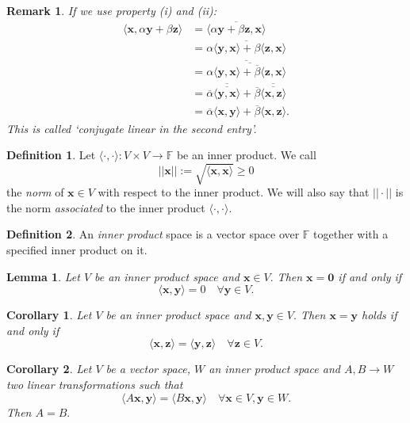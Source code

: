 \documentclass[12pt, a4paper]{article}
\newcommand{\bb}[1]{\mathbb{#1}}
\newtheorem*{remark}{Remark}
\theoremstyle{definition}
\newtheorem{definition}{Definition}[section]
\theoremstyle{plain}
\newtheorem{corollary}{Corollary}[theorem]
\newtheorem{lemma}[theorem]{Lemma}
\begin{document}
\begin{remark}
If we use property (i) and (ii): $$\begin{aligned}
\langle \mathbf{x},\alpha\mathbf{y}+\beta\mathbf{z} \rangle &=\overline{\langle \alpha\mathbf{y}+\beta\mathbf{z}, \mathbf{x} \rangle} \\
&=\overline{\alpha\langle \mathbf{y,x} \rangle +\beta \langle \mathbf{z,x} \rangle}\\
&=\overline{\alpha\overline{\langle \mathbf{y,x} \rangle+\overline{\beta}\langle \mathbf{z,x} \rangle}} \\
&=\overline{\alpha}\overline{\overline{\langle \mathbf{y,x} \rangle}}+\overline{\beta}\overline{\overline{\langle \mathbf{x,z} \rangle}}\\
&=\overline{\alpha}\langle \mathbf{x,y} \rangle+\overline{\beta}\langle \mathbf{x,z} \rangle.
\end{aligned}$$ This is called `conjugate linear in the second entry'.
\end{remark}

\begin{definition}
Let $\langle \cdot,\cdot \rangle:V\times V \to \bb{F}$ be an inner product. We call $$||\mathbf{x}||:=\sqrt{\langle \mathbf{x,x} \rangle}\geq 0$$ the \textit{norm} of $\mathbf{x}\in V$ with respect to the inner product. We will also say that $||\cdot||$ is the norm \textit{associated} to the inner product $\langle \cdot,\cdot \rangle.$
\end{definition}

\begin{definition}
An \textit{inner product} space is a vector space over $\bb{F}$ together with a specified inner product on it.
\end{definition}

\begin{lemma}
Let $V$ be an inner product space and $\mathbf{x} \in V.$ Then $\mathbf{x=0}$ if and only if $$\langle \mathbf{x,y} \rangle=0 \quad \forall\mathbf{y}\in V.$$
\end{lemma}

\begin{corollary}
Let $V$ be an inner product space and $\mathbf{x,y}\in V.$ Then $\mathbf{x=y}$ holds if and only if $$\langle \mathbf{x,z} \rangle=\langle \mathbf{y,z} \rangle \quad \forall\mathbf{z}\in V.$$
\end{corollary}

\begin{corollary}
Let $V$ be a vector space, $W$ an inner product space and $A,B \to W$ two linear transformations such that $$\langle A\mathbf{x},\mathbf{y} \rangle=\langle B\mathbf{x},\mathbf{y} \rangle \quad \forall\mathbf{x}\in V,\mathbf{y}\in W.$$ Then $A=B.$
\end{corollary}
\end{document}
